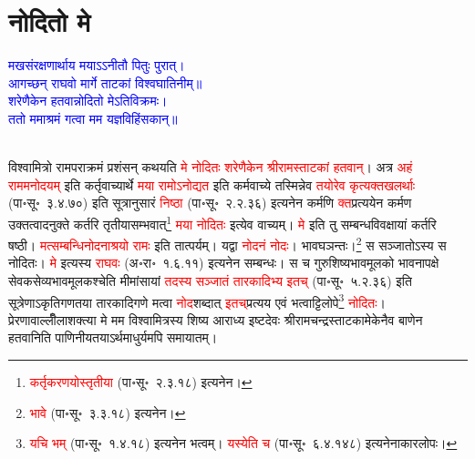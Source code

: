 \section[नोदितो मे]{नोदितो मे}
\centering\textcolor{blue}{मखसंरक्षणार्थाय मयाऽऽनीतौ पितुः पुरात्।\nopagebreak\\
आगच्छन् राघवो मार्गे ताटकां विश्वघातिनीम्॥\\
शरेणैकेन हतवान्नोदितो मेऽतिविक्रमः।\nopagebreak\\
ततो ममाश्रमं गत्वा मम यज्ञविहिंसकान्॥}\nopagebreak\\
\\
\begin{sloppypar}\justifying\noindent\hspace{10mm} विश्वामित्रो राम\-पराक्रमं प्रशंसन् कथयति \textcolor{red}{मे नोदितः शरेणैकेन श्रीरामस्ताटकां हतवान्‌}। अत्र \textcolor{red}{अहं राममनोदयम्‌} इति कर्तृ\-वाच्यार्थे \textcolor{red}{मया रामोऽनोद्यत} इति कर्म\-वाच्ये तस्मिन्नेव \textcolor{red}{तयोरेव कृत्यक्तखलर्थाः} (पा॰सू॰~३.४.७०) इति सूत्रानुसारं \textcolor{red}{निष्ठा} (पा॰सू॰~२.२.३६) इत्यनेन कर्मणि \textcolor{red}{क्त}\-प्रत्ययेन कर्मण उक्तत्वादनुक्ते कर्तरि तृतीया\-सम्भवात्\footnote{\textcolor{red}{कर्तृ\-करणयोस्तृतीया} (पा॰सू॰~२.३.१८) इत्यनेन।} \textcolor{red}{मया नोदितः} इत्येव वाच्यम्।
\textcolor{red}{मे} इति तु सम्बन्ध\-विवक्षायां कर्तरि षष्ठी।
\textcolor{red}{मत्सम्बन्धि\-नोदनाश्रयो रामः} इति तात्पर्यम्। यद्वा \textcolor{red}{नोदनं नोदः}। भावघञन्तः।\footnote{\textcolor{red}{भावे} (पा॰सू॰~३.३.१८) इत्यनेन।} स सञ्जातोऽस्य स नोदितः। \textcolor{red}{मे} इत्यस्य \textcolor{red}{राघवः} (अ॰रा॰~१.६.११) इत्यनेन सम्बन्धः। स च गुरु\-शिष्य\-भाव\-मूलको भावना\-पक्षे सेवक\-सेव्य\-भाव\-मूलकश्चेति मीमांसायां \textcolor{red}{तदस्य सञ्जातं तारकादिभ्य इतच्‌} (पा॰सू॰~५.२.३६) इति सूत्रेणाऽकृति\-गणतया तारकादि\-गणे मत्वा \textcolor{red}{नोद}\-शब्दात् \textcolor{red}{इतच्‌}\-प्रत्यय एवं भत्वाट्टिलोपे\footnote{\textcolor{red}{यचि भम्} (पा॰सू॰~१.४.१८) इत्यनेन भत्वम्। \textcolor{red}{यस्येति च} (पा॰सू॰~६.४.१४८) इत्यनेनाकार\-लोपः।} \textcolor{red}{नोदितः}। प्रेरणावाल्लीँला\-शक्त्या मे मम विश्वामित्रस्य शिष्य आराध्य इष्ट\-देवः श्रीराम\-चन्द्रस्ताटकामेकेनैव बाणेन हतवानिति पाणिनीयतयाऽर्थ\-माधुर्यमपि समायातम्।\end{sloppypar}
